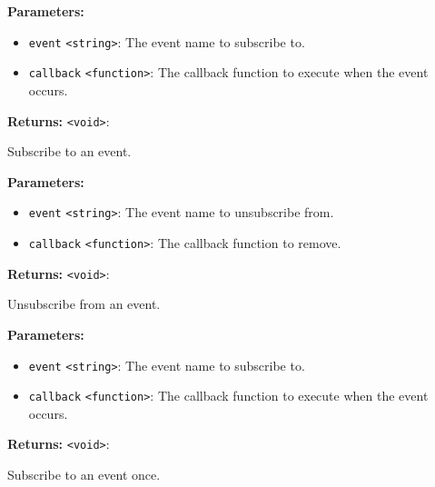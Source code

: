 \documentclass[12pt,a4paper]{article}
\begin{document}
\vspace{5mm}
\noindent {}


\noindent \textbf{Parameters:}
\begin{itemize}
  \item \texttt{event} \texttt{<string>}: The event name to subscribe to.
  \item \texttt{callback} \texttt{<function>}: The callback function to execute when the event occurs.
\end{itemize}

\noindent \textbf{Returns:} \texttt{<void>}:

\noindent Subscribe to an event.

\vspace{5mm}
\noindent {}


\noindent \textbf{Parameters:}
\begin{itemize}
  \item \texttt{event} \texttt{<string>}: The event name to unsubscribe from.
  \item \texttt{callback} \texttt{<function>}: The callback function to remove.
\end{itemize}

\noindent \textbf{Returns:} \texttt{<void>}:

\noindent Unsubscribe from an event.

\vspace{5mm}
\noindent {}


\noindent \textbf{Parameters:}
\begin{itemize}
  \item \texttt{event} \texttt{<string>}: The event name to subscribe to.
  \item \texttt{callback} \texttt{<function>}: The callback function to execute when the event occurs.
\end{itemize}

\noindent \textbf{Returns:} \texttt{<void>}:

\noindent Subscribe to an event once.
\end{document}
